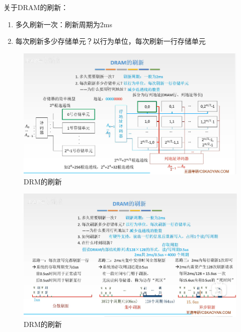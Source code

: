 \documentclass[12pt]{ctexart}
\begin{document}
关于DRAM的刷新：
\begin{enumerate}
    \item 多久刷新一次：刷新周期为2ms
    \item 每次刷新多少存储单元？以行为单位，每次刷新一行存储单元
\end{enumerate}
\begin{figure}[htbp]
    \centering
    \includegraphics[scale=0.6]{DRM的刷新.png}
    \caption{DRM的刷新}
    \end{figure}
\begin{figure}[htbp]
    \centering
    \includegraphics[scale=0.6]{DRM的刷新1.png}
    \caption{DRM的刷新}
     \end{figure}
\end{document}
